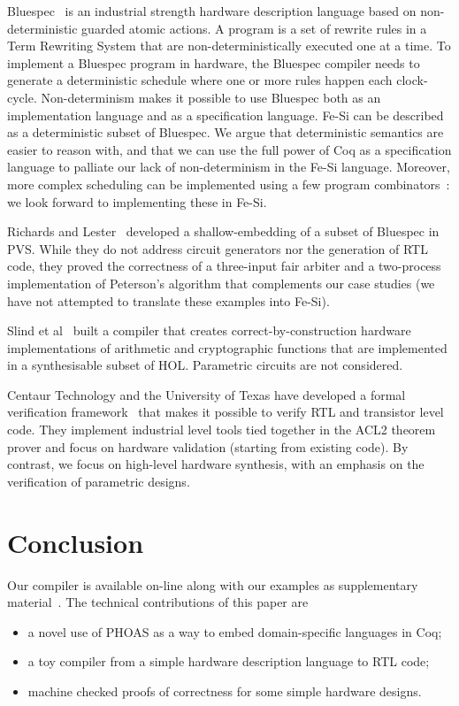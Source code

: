 \documentclass{llncs}
\begin{document}
\medskip

Bluespec~\cite{bluespec} is an industrial strength hardware
description language based on non-deterministic guarded atomic
actions. A program is a set of rewrite rules in a Term Rewriting
System that are non-deterministically executed one at a time. 
%
To implement a Bluespec program in hardware, the Bluespec compiler
needs to generate a deterministic schedule where one or more rules
happen each clock-cycle.
%
Non-determinism makes it possible to use Bluespec both as an
implementation language and as a specification language.
%
%
%
Fe-Si can be described as a deterministic subset of Bluespec. 
%
We argue that deterministic semantics are easier to reason with, and
that we can use the full power of Coq as a specification language to
palliate our lack of non-determinism in the Fe-Si language.
%
Moreover, more complex scheduling can be implemented using a few
program combinators~\cite{DBLP:conf/memocode/DaveAP07}: we look
forward to implementing these in Fe-Si. 

\medskip 

Richards and Lester~\cite{DBLP:journals/isse/RichardsL11} developed a
shallow-embedding of a subset of Bluespec in PVS. While they do not
address circuit generators nor the generation of RTL code, they proved
the correctness of a three-input fair arbiter and a two-process
implementation of Peterson's algorithm that complements our case
studies (we have not attempted to translate these examples into Fe-Si).

Slind et al~\cite{DBLP:journals/fac/SlindOIG07} built a compiler that
creates correct-by-construction hardware implementations of arithmetic
and cryptographic functions that are implemented in a synthesisable
subset of HOL. Parametric circuits are not considered. 

Centaur Technology and the University of Texas have developed a formal
verification framework~\cite{DBLP:conf/memocode/SlobodovaDSH11} that
makes it possible to verify RTL and transistor level code. 
%
They implement industrial level tools tied together in the ACL2
theorem prover and focus on hardware validation (starting from
existing code). By contrast, we focus on high-level hardware
synthesis, with an emphasis on the verification of parametric designs.

\section{Conclusion}
Our compiler is available on-line along with our examples as
supplementary material~\cite{fesi}.
%
The technical contributions of this paper are
\begin{itemize}
\item a novel use of PHOAS as a way to embed domain-specific languages
  in Coq;
\item a toy compiler from a simple hardware description language to
  RTL code;
\item machine checked proofs of correctness for some simple hardware
  designs. 
\end{itemize}
\end{document}
